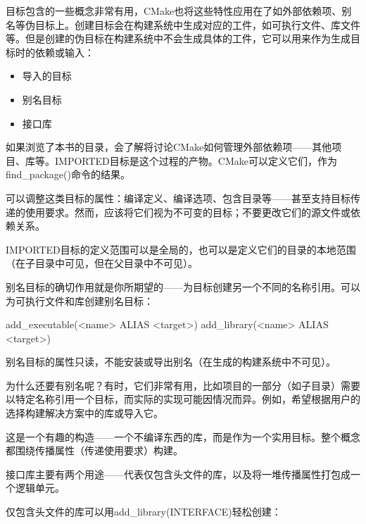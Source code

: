 目标包含的一些概念非常有用，CMake也将这些特性应用在了如外部依赖项、别名等伪目标上。创建目标会在构建系统中生成对应的工件，如可执行文件、库文件等。但是创建的伪目标在构建系统中不会生成具体的工件，它可以用来作为生成目标时的依赖或输入：

\begin{itemize}
\item
导入的目标

\item
别名目标

\item
接口库
\end{itemize}


如果浏览了本书的目录，会了解将讨论CMake如何管理外部依赖项——其他项目、库等。IMPORTED目标是这个过程的产物。CMake可以定义它们，作为find\_package()命令的结果。

可以调整这类目标的属性：编译定义、编译选项、包含目录等——甚至支持目标传递的使用要求。然而，应该将它们视为不可变的目标；不要更改它们的源文件或依赖关系。

IMPORTED目标的定义范围可以是全局的，也可以是定义它们的目录的本地范围（在子目录中可见，但在父目录中不可见）。


别名目标的确切作用就是你所期望的——为目标创建另一个不同的名称引用。可以为可执行文件和库创建别名目标：

\begin{shell}
add_executable(<name> ALIAS <target>)
add_library(<name> ALIAS <target>)
\end{shell}

别名目标的属性只读，不能安装或导出别名（在生成的构建系统中不可见）。

为什么还要有别名呢？有时，它们非常有用，比如项目的一部分（如子目录）需要以特定名称引用一个目标，而实际的实现可能因情况而异。例如，希望根据用户的选择构建解决方案中的库或导入它。


这是一个有趣的构造——一个不编译东西的库，而是作为一个实用目标。整个概念都围绕传播属性（传递使用要求）构建。

接口库主要有两个用途——代表仅包含头文件的库，以及将一堆传播属性打包成一个逻辑单元。

仅包含头文件的库可以用add\_library(INTERFACE)轻松创建：


